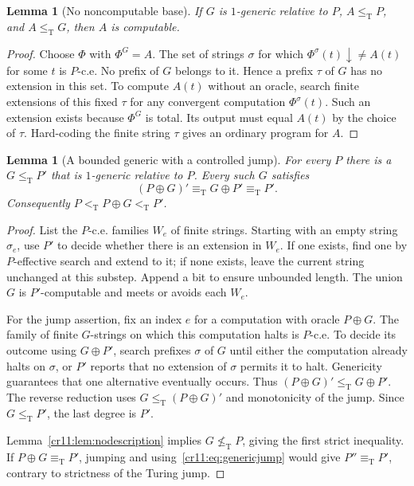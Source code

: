 \documentclass[11pt,letterpaper]{article}
\theoremstyle{plain}
\newtheorem{lemma}[theorem]{Lemma}
\theoremstyle{definition}
\theoremstyle{remark}
\numberwithin{equation}{section}
\newcommand{\leT}{\leq_{\mathrm T}}
\newcommand{\ltT}{<_{\mathrm T}}
\newcommand{\eqT}{\equiv_{\mathrm T}}
\newcommand{\nleT}{\nleq_{\mathrm T}}
\newcommand{\join}{\mathbin{\oplus}}
\begin{document}
\begin{lemma}[No noncomputable base]\label{cr11:lem:nobase}
If $G$ is $1$-generic relative to $P$, $A\leT P$, and $A\leT G$, then
$A$ is computable.
\end{lemma}
\begin{proof}
Choose $\Phi$ with $\Phi^G=A$. The set of strings $\sigma$ for which
$\Phi^\sigma(t)\downarrow\ne A(t)$ for some $t$ is $P$-c.e.
No prefix of $G$ belongs to it. Hence a prefix $\tau$ of $G$ has no
extension in this set. To compute $A(t)$ without an oracle, search finite
extensions of this fixed $\tau$ for any convergent computation
$\Phi^\sigma(t)$. Such an extension exists because $\Phi^G$ is total.
Its output must equal $A(t)$ by the choice of $\tau$. Hard-coding the
finite string $\tau$ gives an ordinary program for $A$.
\end{proof}

\begin{lemma}[A bounded generic with a controlled jump]\label{cr11:lem:lowgeneric}
For every $P$ there is a $G\leT P'$ that is $1$-generic relative to $P$.
Every such $G$ satisfies
\begin{equation}\label{cr11:eq:genericjump}
 (P\join G)'\eqT G\join P'\eqT P'.
\end{equation}
Consequently $P\ltT P\join G\ltT P'$.
\end{lemma}
\begin{proof}
List the $P$-c.e. families $W_e$ of finite strings. Starting with an empty
string $\sigma_e$, use $P'$ to decide whether there is an extension in
$W_e$. If one exists, find one by $P$-effective search and extend to it;
if none exists, leave the current string unchanged at this substep.
Append a bit to ensure unbounded length. The union $G$ is $P'$-computable
and meets or avoids each $W_e$.

For the jump assertion, fix an index $e$ for a computation with oracle
$P\join G$. The family of finite $G$-strings on which this computation
halts is $P$-c.e. To decide its outcome using $G\join P'$, search prefixes
$\sigma$ of $G$ until either the computation already halts on $\sigma$, or
$P'$ reports that no extension of $\sigma$ permits it to halt.
Genericity guarantees that one alternative eventually occurs. Thus
$(P\join G)'\leT G\join P'$. The reverse reduction uses
$G\leT(P\join G)'$ and monotonicity of the jump. Since $G\leT P'$, the
last degree is $P'$.

Lemma~\ref{cr11:lem:nodescription} implies $G\nleT P$, giving the first strict
inequality. If $P\join G\eqT P'$, jumping and using~\eqref{cr11:eq:genericjump}
would give $P''\eqT P'$, contrary to strictness of the Turing jump.
\end{proof}
\end{document}
